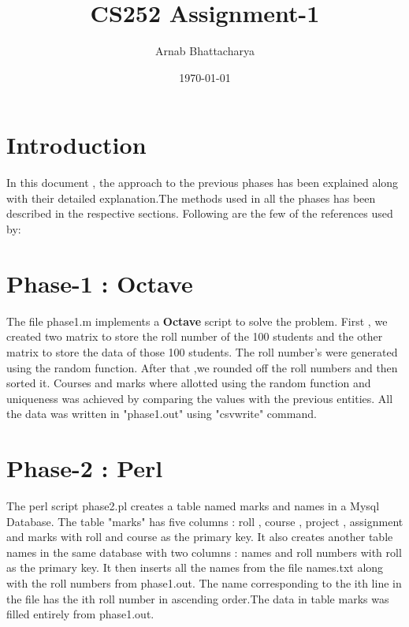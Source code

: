 \documentclass[11pt]{article}
\title{CS252 Assignment-1}
\author{Arnab Bhattacharya}
\date{\today}
\begin{document}
\maketitle

\section {Introduction}
\label{sec:intro}
In this document , the approach to the previous phases has been explained along with their detailed explanation.The methods used in all the phases has been described in the respective sections.
Following are the few of the references used by: 
 ~\cite{google}
 ~\cite{cs251}
 ~\cite{perl}
 ~\cite{sql}


\section{Phase-1 : Octave}
\label{sec:ph1}
The file phase1.m implements a {\bf Octave} script to solve the problem. First , we created two matrix to store the roll number of the 100 students and the other matrix to store the data of those 100 students. The roll number's were generated using the random function. After that ,we rounded off the roll numbers and then sorted it. Courses and marks where allotted using the random function and uniqueness was achieved by comparing the values with the previous entities. All the data was written in "phase1.out" using "csvwrite" command.

\section{Phase-2 : Perl}
\label{sec:ph2}
The perl script phase2.pl creates a table named marks and names in a Mysql Database. The table "marks" has five columns : roll ,  course , project , assignment and marks with roll and course as the primary key. It also creates another table names in the same database with two columns : names and roll numbers
with roll as the primary key. It then inserts all the names from the file names.txt along with the roll numbers from phase1.out.
The name corresponding to the ith line in the file has the ith roll number in ascending order.The data in table marks was filled entirely from phase1.out.
 
\end{document}
